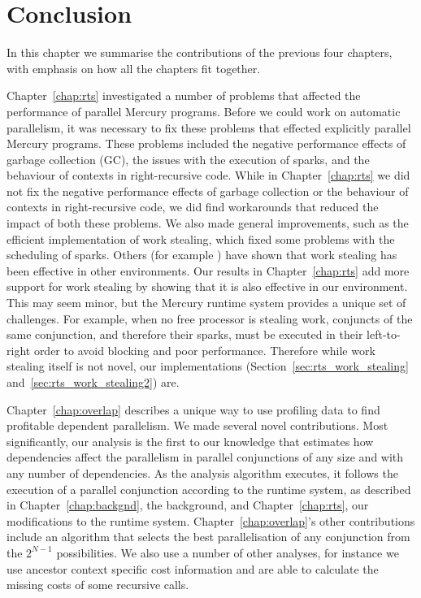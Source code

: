 
\chapter{Conclusion}
\label{chap:conc}


In this chapter we summarise the contributions of the previous four
chapters,
with emphasis on how all the chapters fit together.

Chapter~\ref{chap:rts}
investigated a number of problems that affected the performance of parallel
Mercury programs.
Before we could work on automatic parallelism,
it was necessary to fix these problems that effected explicitly parallel
Mercury programs.
These problems included the negative performance effects of garbage collection (GC),
the issues with the execution of sparks,
and the behaviour of contexts in right-recursive code.
While in Chapter~\ref{chap:rts} we did not fix the negative performance
effects of garbage collection or
the behaviour of contexts in right-recursive code,
we did find workarounds that reduced the impact of both these problems.
We also made general improvements, such as the efficient implementation of
work stealing,
which fixed some problems with the scheduling of sparks.
Others (for example \citet{halstead:1985:multilisp}) have shown that work
stealing has been effective in other environments.
Our results in Chapter~\ref{chap:rts} add more support for work stealing by
showing that it is also effective in our environment.
This may seem minor,
but the Mercury 
runtime system provides a unique set of challenges.
For example, 
when no free processor is stealing work,
conjuncts of the same conjunction,
and therefore their sparks,
must be executed in their left-to-right order to avoid blocking and poor
performance.
Therefore while work stealing itself is not novel,
our implementations (Section~\ref{sec:rts_work_stealing}
and~\ref{sec:rts_work_stealing2}) are.

Chapter~\ref{chap:overlap} describes a unique way to use profiling data to
find profitable dependent parallelism.
We made several novel contributions.
Most significantly,
our analysis is the first to our knowledge that estimates how dependencies affect
the parallelism in parallel conjunctions of any size
and with any number of dependencies.
As the analysis algorithm executes,
it follows the execution of a parallel conjunction according to the runtime
system, as described in Chapter~\ref{chap:backgnd}, the background, and
Chapter~\ref{chap:rts}, our modifications to the runtime system.
Chapter~\ref{chap:overlap}'s other contributions include
an algorithm that selects the best parallelisation of any conjunction from
the $2^{N-1}$ possibilities.
We also use a number of other analyses,
for instance we use ancestor context specific cost information and are able
to calculate the missing costs of some recursive calls.

